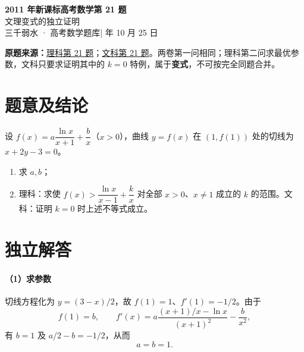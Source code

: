 \documentclass[UTF8,a4paper,10pt]{ctexart}
\begin{document}
\begin{center}
{\Large\bfseries 2011 年新课标高考数学第 21 题}\\[3pt]
{\normalsize 文理变式的独立证明}\\[4pt]
{\small 三千弱水 · 高考数学题库\quad| 年 10 月 25 日}
\end{center}
\vspace{3pt}
\noindent\textbf{原题来源：}\href{https://github.com/DxAThing/Gaokao-Math-Problems-Compilation/blob/f1ae169b58a75b3db6e35c670b3f0d5c78718188/content/2011/new_curriculum_science.tex\#L583}{理科第 21 题}；\href{https://github.com/DxAThing/Gaokao-Math-Problems-Compilation/blob/f1ae169b58a75b3db6e35c670b3f0d5c78718188/content/2011/new_curriculum_liberal.tex\#L473}{文科第 21 题}。两卷第一问相同；理科第二问求最优参数，文科只要求证明其中的 $k=0$ 特例，属于\textbf{变式}，不可按完全同题合并。

\section*{题意及结论}
设 $f(x)=a\dfrac{\ln x}{x+1}+\dfrac bx$（$x>0$），曲线 $y=f(x)$ 在 $(1,f(1))$ 处的切线为 $x+2y-3=0$。
\begin{enumerate}[label=\textbf{（\arabic*）}]
\item 求 $a,b$；
\item 理科：求使 $f(x)>\dfrac{\ln x}{x-1}+\dfrac{k}{x}$ 对全部 $x>0$、$x\ne1$ 成立的 $k$ 的范围。文科：证明 $k=0$ 时上述不等式成立。
\end{enumerate}

\section*{独立解答}
\paragraph{（1）求参数} 切线方程化为 $y=(3-x)/2$，故 $f(1)=1$、$f'(1)=-1/2$。由于
\[
f(1)=b,\qquad
f'(x)=a\frac{(x+1)/x-\ln x}{(x+1)^2}-\frac{b}{x^2},
\]
有 $b=1$ 及 $a/2-b=-1/2$，从而
\[\boxed{a=b=1}.\]
\end{document}

